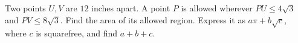 Two points $U,V$ are $12$ inches apart. A point $P$ is allowed wherever $PU\le4\sqrt3$ and $PV\le8\sqrt3$. Find the area of its allowed region. Express it as $a\pi+b\sqrt c$, where $c$ is squarefree, and find $a+b+c$.
